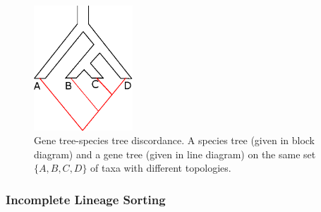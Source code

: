 \begin{figure}[!tb]
	\centering
	\includegraphics[width=0.33\textwidth]{Figure/discordance.eps}
	\caption{Gene tree-species tree discordance. A species tree (given in block diagram) and a gene tree (given in line diagram) on the same set $\{A,B,C,D\}$ of taxa with different topologies.}
	\label{fig:discordance}
\end{figure}



\subsubsection{Incomplete Lineage Sorting}

